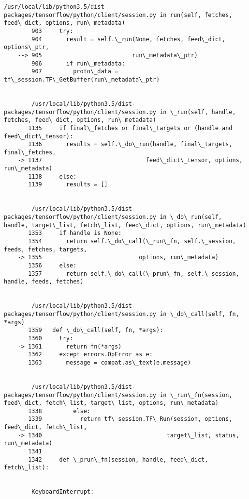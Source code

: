 \documentclass[11pt]{article}
\begin{document}
\begin{Verbatim}[commandchars=\\\{\}]
        /usr/local/lib/python3.5/dist-packages/tensorflow/python/client/session.py in run(self, fetches, feed\_dict, options, run\_metadata)
        903     try:
        904       result = self.\_run(None, fetches, feed\_dict, options\_ptr,
    --> 905                          run\_metadata\_ptr)
        906       if run\_metadata:
        907         proto\_data = tf\_session.TF\_GetBuffer(run\_metadata\_ptr)


        /usr/local/lib/python3.5/dist-packages/tensorflow/python/client/session.py in \_run(self, handle, fetches, feed\_dict, options, run\_metadata)
       1135     if final\_fetches or final\_targets or (handle and feed\_dict\_tensor):
       1136       results = self.\_do\_run(handle, final\_targets, final\_fetches,
    -> 1137                              feed\_dict\_tensor, options, run\_metadata)
       1138     else:
       1139       results = []


        /usr/local/lib/python3.5/dist-packages/tensorflow/python/client/session.py in \_do\_run(self, handle, target\_list, fetch\_list, feed\_dict, options, run\_metadata)
       1353     if handle is None:
       1354       return self.\_do\_call(\_run\_fn, self.\_session, feeds, fetches, targets,
    -> 1355                            options, run\_metadata)
       1356     else:
       1357       return self.\_do\_call(\_prun\_fn, self.\_session, handle, feeds, fetches)


        /usr/local/lib/python3.5/dist-packages/tensorflow/python/client/session.py in \_do\_call(self, fn, *args)
       1359   def \_do\_call(self, fn, *args):
       1360     try:
    -> 1361       return fn(*args)
       1362     except errors.OpError as e:
       1363       message = compat.as\_text(e.message)


        /usr/local/lib/python3.5/dist-packages/tensorflow/python/client/session.py in \_run\_fn(session, feed\_dict, fetch\_list, target\_list, options, run\_metadata)
       1338         else:
       1339           return tf\_session.TF\_Run(session, options, feed\_dict, fetch\_list,
    -> 1340                                    target\_list, status, run\_metadata)
       1341 
       1342     def \_prun\_fn(session, handle, feed\_dict, fetch\_list):


        KeyboardInterrupt: 

    \end{Verbatim}
\end{document}
